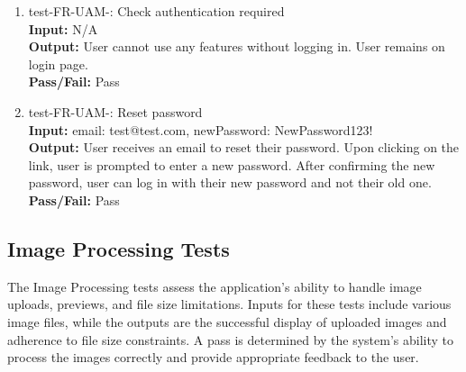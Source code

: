 \documentclass[12pt, titlepage]{article}
\begin{document}
\begin{enumerate}
\item test-FR-UAM-: Check authentication required\\
  \textbf{Input:} N/A\\
  \textbf{Output:} User cannot use any features without logging in. User remains
  on login page.\\
  \textbf{Pass/Fail:} Pass\\
\item test-FR-UAM-: Reset password\\
  \textbf{Input:} email: test@test.com, newPassword: NewPassword123!\\
  \textbf{Output:} User receives an email to reset their password. Upon clicking
  on the link, user is prompted to enter a new password. After confirming the
  new password, user can log in with their new password and not their old one.\\
  \textbf{Pass/Fail:} Pass\\
\end{enumerate}

\subsection{Image Processing Tests}\label{sec:FR-IP}
The Image Processing tests assess the application's ability to handle image uploads, 
previews, and file size limitations. Inputs for these tests include various image files, 
while the outputs are the successful display of uploaded images and adherence to file size 
constraints. A pass is determined by the system's ability to process the images correctly 
and provide appropriate feedback to the user.
\end{document}
